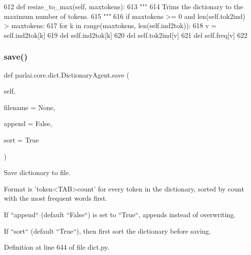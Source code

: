 \begin{DoxyCode}
612     \textcolor{keyword}{def }resize\_to\_max(self, maxtokens):
613         \textcolor{stringliteral}{"""}
614 \textcolor{stringliteral}{        Trims the dictionary to the maximum number of tokens.}
615 \textcolor{stringliteral}{        """}
616         \textcolor{keywordflow}{if} maxtokens >= 0 \textcolor{keywordflow}{and} len(self.tok2ind) > maxtokens:
617             \textcolor{keywordflow}{for} k \textcolor{keywordflow}{in} range(maxtokens, len(self.ind2tok)):
618                 v = self.ind2tok[k]
619                 del self.ind2tok[k]
620                 del self.tok2ind[v]
621                 del self.freq[v]
622 
\end{DoxyCode}
\mbox{\label{classparlai_1_1core_1_1dict_1_1DictionaryAgent_a0c6a8d8b67fe978549b328e7b7b07450}} 
\subsubsection{\texorpdfstring{save()}{save()}}
{\footnotesize\ttfamily def parlai.\+core.\+dict.\+Dictionary\+Agent.\+save (\begin{DoxyParamCaption}\item[{}]{self,  }\item[{}]{filename = {\ttfamily None},  }\item[{}]{append = {\ttfamily False},  }\item[{}]{sort = {\ttfamily True} }\end{DoxyParamCaption})}

\begin{DoxyVerb}Save dictionary to file.

Format is 'token<TAB>count' for every token in the dictionary, sorted
by count with the most frequent words first.

If ``append`` (default ``False``) is set to ``True``, appends instead of
overwriting.

If ``sort`` (default ``True``), then first sort the dictionary before saving.
\end{DoxyVerb}
 

Definition at line 644 of file dict.\+py.



